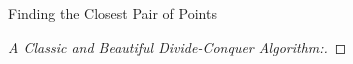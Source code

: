 \begin{frame}{}
  \begin{exampleblock}{Finding the Closest Pair of Points}
  \end{exampleblock}

  \pause
  \begin{proof}[A Classic and Beautiful Divide-Conquer Algorithm:]
    \pause
    \vspace{-0.40cm}
  \end{proof}
\end{frame}
